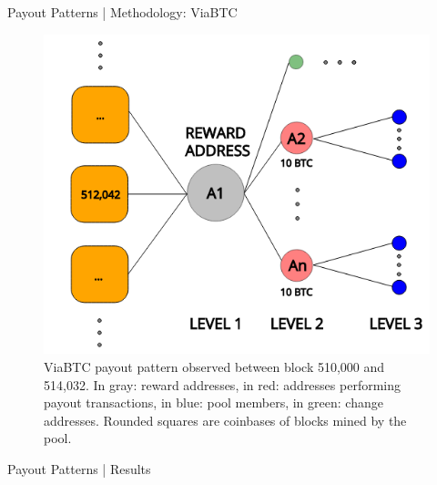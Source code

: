 \documentclass[10pt]{beamer}
\begin{document}
\begin{frame}[fragile]{Payout Patterns | Methodology: ViaBTC}
    \begin{figure}
        \includegraphics[width=.5\textwidth]{images/flow_ViaBTC_example2.png}
        \caption{ViaBTC payout pattern observed between block 510,000 and 514,032. In gray: reward addresses, in red: addresses performing payout transactions, in blue: pool members, in green: change addresses. Rounded squares are coinbases of blocks mined by the pool.}
        \label{fig:viabtc_flow}
    \end{figure}
\end{frame}

\begin{frame}[fragile]{Payout Patterns | Results}
    \setlength{\tabcolsep}{2pt}
    \begin{table}
        \centering
        \caption{Statistics of retrieved data between block 510,000 and 514,032 ($\sim$ 4 weeks). $N_{B}$: number of blocks mined by the pool, $N_{TX}$: number of identified payout transactions, $N_{A}$: number of identified members' addresses, $N_{C}$: number of identified clusters, $BTC_{M}$: BTC mined by the pool, $BTC_{P}$: BTC paid to pool members (addresses), $\mu$: median value of address reuse.}\label{miners_stats}
    \end{table}
\end{frame}
\end{document}
